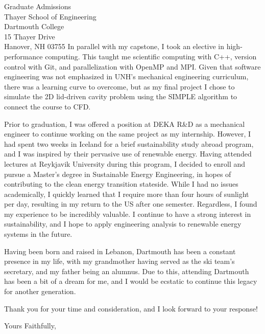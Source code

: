 \documentclass{letter}
\begin{document}
\begin{letter}{Graduate Admissions \\ Thayer School of Engineering \\ Dartmouth College \\ 15 Thayer Drive \\ Hanover, NH 03755}
    In parallel with my capstone, I took an elective in high-performance computing. This taught me scientific computing with C++, version 
    control with Git, and parallelization with OpenMP and MPI. Given that software engineering was not emphasized in UNH's 
    mechanical engineering curriculum, there was a learning curve to overcome, but as my final project I chose to simulate the 2D lid-driven 
    cavity problem using the SIMPLE algorithm to connect the course to CFD.

    Prior to graduation, I was offered a position at DEKA R\&D as a mechanical engineer to continue working on the same project as
    my internship. However, I had spent two weeks in Iceland for a brief sustainability study abroad program, and I was inspired by their
    pervasive use of renewable energy. Having attended lectures at Reykjavik University during this program, I decided to enroll  
    and pursue a Master's degree in Sustainable Energy Engineering, in hopes of contributing to the clean energy transition stateside. 
    While I had no issues academically, I quickly learned that I require more than four hours of sunlight per day, resulting in my return
    to the US after one semester. Regardless, I found my experience to be incredibly valuable. I continue to have a strong interest in 
    sustainability, and I hope to apply engineering analysis to renewable energy systems in the future.

    Having been born and raised in Lebanon, Dartmouth has been a constant presence in my life, with my grandmother having served as 
    the ski team's secretary, and my father being an alumnus. Due to this, attending Dartmouth has been a bit 
    of a dream for me, and I would be ecstatic to continue this legacy for another generation.

    Thank you for your time and consideration, and I look forward to your response!

    \closing{Yours Faithfully,}

\end{letter}
\end{document}
